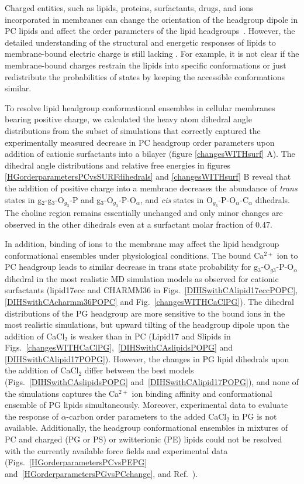 \documentclass[journal=jpcbfk,manuscript=article]{achemso}
\begin{document}
Charged entities, such as lipids, proteins, surfactants, drugs, and ions incorporated in membranes can change the orientation of the headgroup dipole in PC lipids and affect the order parameters of the lipid headgroups~\cite{seelig87}. However, the detailed understanding of the structural and energetic responses of lipids to membrane-bound electric charge is still lacking \cite{Semchyschyn04}. For example, it is not clear if the membrane-bound charges restrain the lipids into specific conformations or just redistribute the probabilities of states by keeping the accessible conformations similar. 

To resolve lipid headgroup conformational ensembles in cellular membranes bearing positive charge,
we calculated the heavy atom dihedral angle distributions from 
the subset of simulations 
that correctly captured the experimentally measured decrease in PC headgroup order parameters upon addition of cationic surfactants into a bilayer (figure \ref{changesWITHsurf} A).
The dihedral angle distributions and relative free energies
in figures \ref{HGorderparametersPCvsSURFdihedrals} and \ref{changesWITHsurf} B reveal that the
addition of positive charge into a membrane 
decreases the abundance of \textit{trans} states in g$_2$-g$_3$-O$_{g_3}$-P and g$_3$-O$_{g_3}$-P-O$_\alpha$, and \textit{cis} states in O$_{g_3}$-P-O$_\alpha$-C$_\alpha$ dihedrals.
The choline region remains essentially unchanged and only minor changes are observed in the other dihedrals even at a surfactant molar fraction of 0.47.

In addition, binding of ions to the membrane may affect the lipid headgroup conformational ensembles under physiological conditions.
The bound Ca$^{2+}$ ion to PC headgroup leads to similar decrease in trans state probability for g$_3$-O$_{g3}$-P-O$_\alpha$ dihedral
in the most realistic MD simulation models
as observed for cationic surfactants
(lipid17ecc and CHARMM36 in Figs.~\ref{DIHSwithCAlipid17eccPOPC}, \ref{DIHSwithCAcharmm36POPC} and Fig.~\ref{changesWITHCaClPG}).
The dihedral distributions of the PG headgroup are more sensitive to the bound ions in the most realistic simulations,
but upward tilting of the headgroup dipole upon the addition of CaCl$_2$ is weaker than in PC
(Lipid17 and Slipids in Figs.~\ref{changesWITHCaClPG},~\ref{DIHSwithCAslipidsPOPG} and \ref{DIHSwithCAlipid17POPG}).
However, the changes in PG lipid dihedrals upon the addition of CaCl$_2$ differ between the best models (Figs.~\ref{DIHSwithCAslipidsPOPG} and~\ref{DIHSwithCAlipid17POPG}), and none of the simulations captures the Ca$^{2+}$ ion binding affinity and conformational ensemble of PG lipids simultaneously. Moreover, experimental data to evaluate the response of $\alpha$-carbon order parameters to the added CaCl$_2$ in PG is not available.
Additionally, the headgroup conformational ensembles in mixtures of PC and charged (PG or PS) or zwitterionic (PE)
lipids could not be resolved with the currently available force fields and experimental data
(Figs.~\ref{HGorderparametersPCvsPEPG} and~\ref{HGorderparametersPGvsPCchange}, and Ref.~\cite{antila19,melcr20}).
\end{document}
